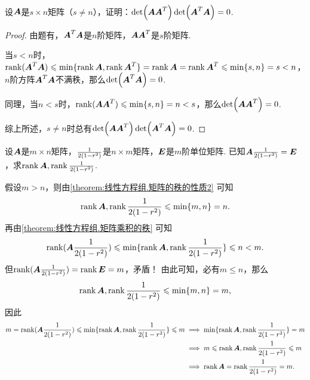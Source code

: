 \begin{example}
设\(\A\)是\(s \times n\)矩阵（\(s \neq n\)），证明：\(\det(\A \A^T) \det(\A^T \A) = 0\).
\begin{proof}
由题有，\(\A^T \A\)是\(n\)阶矩阵，\(\A \A^T\)是\(s\)阶矩阵.

当\(s < n\)时，\(\rank(\A^T \A) \leqslant \min\{ \rank\A, \rank\A^T \} = \rank\A = \rank\A^T \leqslant \min\{s,n\} = s < n\)，\(n\)阶方阵\(\A^T \A\)不满秩，那么\(\det(\A^T \A) = 0\).

同理，当\(n < s\)时，\(\rank(\A \A^T) \leqslant \min\{s,n\} = n < s\)，那么\(\det(\A \A^T) = 0\).

综上所述，\(s \neq n\)时总有\(\det(\A \A^T) \det(\A^T \A) = 0\).
\end{proof}
\end{example}

\begin{example}
设\(\A\)是\(m \times n\)矩阵，\(\B\)是\(n \times m\)矩阵，\(\E\)是\(m\)阶单位矩阵.
已知\(\A\B = \E\)，求\(\rank\A,\rank\B\).
\begin{solution}
假设\(m > n\)，则由\cref{theorem:线性方程组.矩阵的秩的性质2} 可知\[
\rank\A,\rank\B \leqslant \min\{m,n\} = n.
\]再由\cref{theorem:线性方程组.矩阵乘积的秩} 可知\[
\rank(\A\B) \leqslant \min\{\rank\A,\rank\B\} \leqslant n < m.
\]但\(\rank(\A\B) = \rank\E = m\)，矛盾！
由此可知，必有\(m \leqslant n\)，那么\[
\rank\A,\rank\B \leqslant \min\{m,n\} = m,
\]因此\begin{align*}
m = \rank(\A\B) \leqslant \min\{\rank\A,\rank\B\} \leqslant m
&\implies
\min\{\rank\A,\rank\B\} = m \\
&\implies
m \leqslant \rank\A,\rank\B \leqslant m \\
&\implies \rank\A=\rank\B=m.
\end{align*}
\end{solution}
\end{example}

